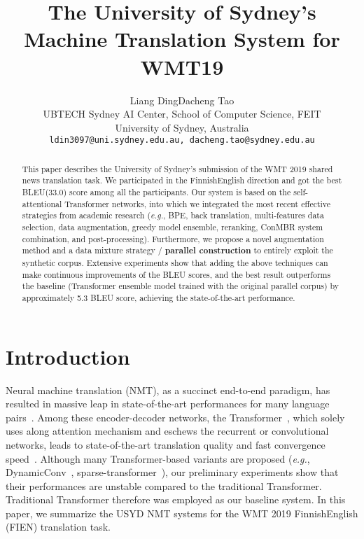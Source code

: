 \documentclass[11pt,a4paper]{article}
\title{The University of Sydney's Machine Translation System for WMT19}
\author{Liang Ding\quad \quad Dacheng Tao\\
  UBTECH Sydney AI Center, School of Computer Science, FEIT\\
  University of Sydney, Australia\\
  {\tt ldin3097@uni.sydney.edu.au, dacheng.tao@sydney.edu.au}
 }
\date{}
\begin{document}
\maketitle
\begin{abstract}
  This paper describes the University of Sydney's submission of the WMT 2019 shared news translation task. 
  We participated in the FinnishEnglish direction and got the best BLEU(33.0) score among all the participants. 
  Our system is based on the self-attentional Transformer networks, into which we integrated the most recent effective strategies from academic research (\textit{e.g.}, BPE, back translation, multi-features data selection, data augmentation, greedy model ensemble, reranking, ConMBR system combination, and post-processing). Furthermore, we propose a novel augmentation method  and a data mixture strategy / \textbf{ parallel construction} to entirely exploit the synthetic corpus. Extensive experiments show that adding the above techniques can make continuous improvements of the BLEU scores, and the best result outperforms the baseline (Transformer ensemble model trained with the original parallel corpus) by approximately 5.3 BLEU score, achieving the state-of-the-art performance.
\end{abstract}

\section{Introduction}
  Neural machine translation (NMT), as a succinct end-to-end paradigm, has resulted in massive leap in state-of-the-art performances for many language pairs~\cite{D13-1176,seq2seq,rnnsearch,convs2s,gnmt,transformer}. Among these encoder-decoder networks, the Transformer~\cite{transformer}, which solely uses along attention mechanism and eschews the recurrent or convolutional networks, leads to state-of-the-art translation quality and fast convergence speed~\cite{ahmed2017weighted}.
  Although many Transformer-based variants are proposed (\textit{e.g.}, DynamicConv~\cite{wu2018pay}, sparse-transformer~\cite{child2019generating}), our preliminary experiments show that their performances are unstable compared to the traditional Transformer. Traditional Transformer therefore was employed as our baseline system. In this paper, we summarize the USYD NMT systems for the WMT 2019 FinnishEnglish (FIEN) translation task.
 
\end{document}
